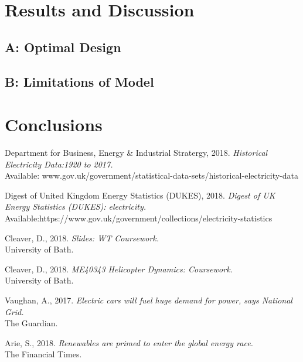 \documentclass[11pt]{article}
\begin{document}
\section{Results and Discussion}



\subsection{A: Optimal Design}
\subsection{B: Limitations of Model}
\section{Conclusions}










\begin{thebibliography}{9}

Department for Business, Energy \& Industrial Stratergy, 2018. 
\textit{Historical Electricity Data:1920 to 2017.}\\
Available: www.gov.uk/government/statistical-data-sets/historical-electricity-data

Digest of United Kingdom Energy Statistics (DUKES), 2018. 
\textit{Digest of UK Energy Statistics (DUKES): electricity.}
Available:https://www.gov.uk/government/collections/electricity-statistics

Cleaver, D., 2018. 
\textit{Slides: WT Coursework.}\\
University of Bath.

Cleaver, D., 2018. 
\textit{ME40343 Helicopter Dynamics: Coursework.}\\
University of Bath.

Vaughan, A., 2017. 
\textit{Electric cars will fuel huge demand for power, says National Grid.}\\
The Guardian.

Arie, S., 2018. 
\textit{Renewables are primed to enter the global energy race.}\\
The Financial Times.
\end{thebibliography}
\end{document}
